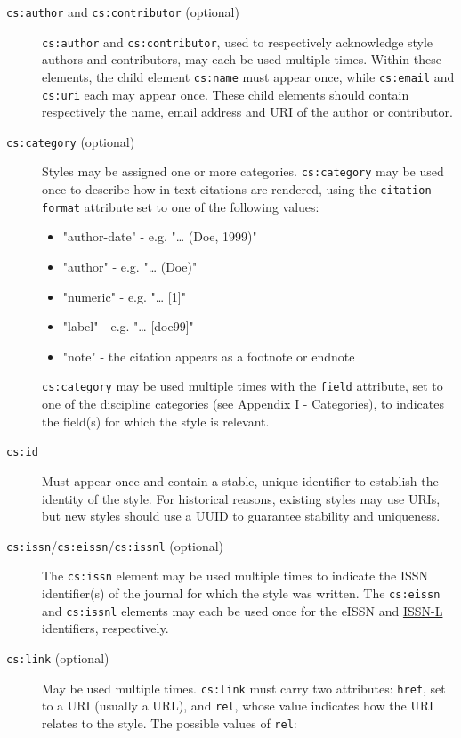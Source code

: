 \begin{description}
\item[\texttt{cs:author} and \texttt{cs:contributor} (optional)]
\texttt{cs:author} and \texttt{cs:contributor}, used to respectively
acknowledge style authors and contributors, may each be used multiple
times. Within these elements, the child element \texttt{cs:name} must
appear once, while \texttt{cs:email} and \texttt{cs:uri} each may appear
once. These child elements should contain respectively the name, email
address and URI of the author or contributor.
\item[\texttt{cs:category} (optional)]
Styles may be assigned one or more categories. \texttt{cs:category} may
be used once to describe how in-text citations are rendered, using the
\texttt{citation-format} attribute set to one of the following values:

\begin{itemize}
\tightlist
\item
  "author-date" - e.g. "\ldots{} (Doe, 1999)"
\item
  "author" - e.g. "\ldots{} (Doe)"
\item
  "numeric" - e.g. "\ldots{} {[}1{]}"
\item
  "label" - e.g. "\ldots{} {[}doe99{]}"
\item
  "note" - the citation appears as a footnote or endnote
\end{itemize}

\texttt{cs:category} may be used multiple times with the \texttt{field}
attribute, set to one of the discipline categories (see
\protect\hyperlink{appendix-i---categories}{Appendix I - Categories}),
to indicates the field(s) for which the style is relevant.
\item[\texttt{cs:id}]
Must appear once and contain a stable, unique identifier to establish
the identity of the style. For historical reasons, existing styles may
use URIs, but new styles should use a UUID to guarantee stability and
uniqueness.
\item[\texttt{cs:issn}/\texttt{cs:eissn}/\texttt{cs:issnl} (optional)]
The \texttt{cs:issn} element may be used multiple times to indicate the
ISSN identifier(s) of the journal for which the style was written. The
\texttt{cs:eissn} and \texttt{cs:issnl} elements may each be used once
for the eISSN and
\href{http://www.issn.org/2-22637-What-is-an-ISSN-L.php}{ISSN-L}
identifiers, respectively.
\item[\texttt{cs:link} (optional)]
May be used multiple times. \texttt{cs:link} must carry two attributes:
\texttt{href}, set to a URI (usually a URL), and \texttt{rel}, whose
value indicates how the URI relates to the style. The possible values of
\texttt{rel}:


\end{description}
